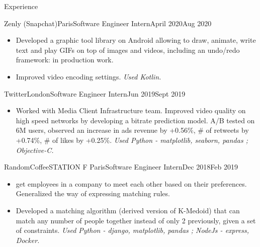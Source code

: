 \documentclass{resume}
\begin{document}
	\begin{rSection}{Experience}
        \begin{job}{Zenly (Snapchat)}{Paris}{Software Engineer Intern}{April 2020}{Aug 2020}{
            \begin{itemize}
                \item Developed a graphic tool library on Android allowing to draw, animate, write text and play GIFs on top of images and videos, including an undo/redo framework: in production work.
                \item Improved video encoding settings. \em{Used Kotlin.}
            \end{itemize}
        }
        \end{job}

		\begin{job}{Twitter}{London}{Software Engineer Intern}{Jun 2019}{Sept 2019}{
            \begin{itemize}
                \item Worked with Media Client Infrastructure team. Improved video quality on high speed networks by developing a bitrate prediction model. A/B tested on 6M users, observed an increase in ads revenue by +0.56\%, \# of retweets by +0.74\%, \# of likes by +0.25\%. \em{Used Python - matplotlib, seaborn, pandas ; Objective-C.}
            \end{itemize}
		}
		\end{job}

		\begin{job}{RandomCoffee}{STATION F Paris}{Software Engineer Intern}{Dec 2018}{Feb 2019}{
            \begin{itemize}
                \item {} get employees in a company to meet each other based on their preferences. Generalized the way of expressing matching rules.
                \item Developed a matching algorithm (derived version of K-Medoid) that can match any number of people together instead of only 2 previously, given a set of constraints. \em{Used Python - django, matplotlib, pandas ; NodeJs - express, Docker.}
            \end{itemize}
		}
		\end{job}


\end{rSection}
\end{document}
